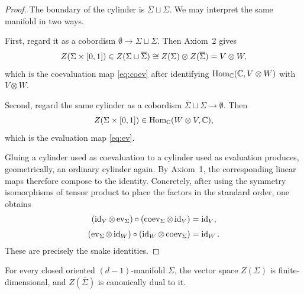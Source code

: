 \begin{proof}
The boundary of the cylinder is $\overline{\Sigma} \sqcup \Sigma$. We may interpret the same manifold in two ways.

\medskip

\noindent First, regard it as a cobordism $\emptyset \to \Sigma \sqcup \overline{\Sigma}$. Then Axiom~2 gives
\begin{equation*}
Z(\Sigma \times [0,1]) \in Z(\Sigma \sqcup \overline{\Sigma})
\cong
Z(\Sigma)\otimes Z(\overline{\Sigma})
\\
=
V \otimes W,
\end{equation*}
which is the coevaluation map \eqref{eq:coev} after identifying $\operatorname{Hom}_{\mathbb{C}}(\mathbb{C}, V\otimes W)$ with $V\otimes W$.

\medskip

\noindent Second, regard the same cylinder as a cobordism $\overline{\Sigma} \sqcup \Sigma \to \emptyset$. Then
\begin{equation*}
Z(\Sigma \times [0,1]) \in \operatorname{Hom}_{\mathbb{C}}(W \otimes V, \mathbb{C}),
\end{equation*}
which is the evaluation map \eqref{eq:ev}.

\medskip

\noindent Gluing a cylinder used as coevaluation to a cylinder used as evaluation produces, geometrically, an ordinary cylinder again. By Axiom~1, the corresponding linear maps therefore compose to the identity. Concretely, after using the symmetry isomorphisms of tensor product to place the factors in the standard order, one obtains
\begin{align}
(\operatorname{id}_V \otimes \operatorname{ev}_{\Sigma}) \circ (\operatorname{coev}_{\Sigma} \otimes \operatorname{id}_V) &= \operatorname{id}_V, \label{eq:snake-V} \\[1mm]
(\operatorname{ev}_{\Sigma} \otimes \operatorname{id}_W) \circ (\operatorname{id}_W \otimes \operatorname{coev}_{\Sigma}) &= \operatorname{id}_W. \label{eq:snake-W}
\end{align}
These are precisely the snake identities.
\end{proof}

\begin{corollary}\label{cor:finite-dimensionality}
For every closed oriented $(d-1)$-manifold $\Sigma$, the vector space $Z(\Sigma)$ is finite-dimensional, and $Z(\overline{\Sigma})$ is canonically dual to it.
\end{corollary}

